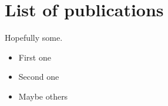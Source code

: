 \chapter{List of publications}
Hopefully some.

\begin{itemize}
    \item First one
    \item Second one
    \item Maybe others
\end{itemize}